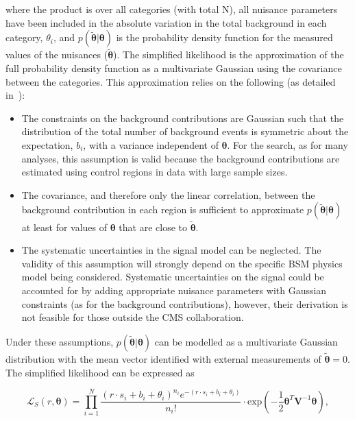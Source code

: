 where the product is over all categories (with total N), all nuisance parameters
have been included in the absolute variation in the total background in each category, $\theta_i$, and
$p(\tilde{\boldsymbol{\theta}}|\boldsymbol{\theta})$ is the probability density function for the measured 
values of the nuisances ($\tilde{\boldsymbol{\theta}}$). 
The simplified likelihood is the approximation of the full probability density function 
as a multivariate Gaussian using the covariance between the categories.
This approximation relies on the following (as detailed in~\cite{simp-lik}):
\begin{itemize}
\item{The constraints on the background contributions are Gaussian such that the distribution of 
the total number of background events is symmetric about the expectation, $b_{i}$, 
with a variance independent of $\boldsymbol{\theta}$. For the \alphat search, as for many analyses, 
this assumption is valid because the background contributions are estimated using control regions in 
data with large sample sizes.}

\item{The covariance, and therefore only the linear correlation, 
between the background contribution in each region is sufficient 
to approximate $p(\tilde{\boldsymbol{\theta}}|\boldsymbol{\theta})$ 
at least for values of $\boldsymbol{\theta}$ that are close to $\tilde{\boldsymbol{\theta}}$.}

\item{The systematic uncertainties in the signal model can be neglected. The validity of 
this assumption will strongly depend on the specific BSM physics model being considered. 
Systematic uncertainties on the signal could be accounted for by adding appropriate 
nuisance parameters with Gaussian constraints (as for the background contributions), however,
their derivation is not feasible for those outside the CMS collaboration.} 
\end{itemize}

Under these assumptions, $p(\tilde{\boldsymbol{\theta}}|\boldsymbol{\theta})$ can be modelled as a multivariate 
Gaussian distribution with the mean vector identified with external measurements of 
$\tilde{\boldsymbol{\theta}}=0$. The simplified likelihood can be expressed as

\begin{equation}
\mathcal{L}_{S}(r, \boldsymbol{\theta}) =  \prod_{i=1}^{N} \dfrac{(r \cdot s_{i}+b_{i}+\theta_{i})^{n_{i}} e^{-(r \cdot s_{i}+b_{i}+\theta_{i})} }{n_{i}!} \cdot  
\mathrm{exp}\left(-\dfrac{1}{2} \boldsymbol{\theta}^{T}\mathrm{\mathbf{V}}^{-1}\boldsymbol{\theta} \right),
\label{eq:full-likelihood}
\end{equation}


